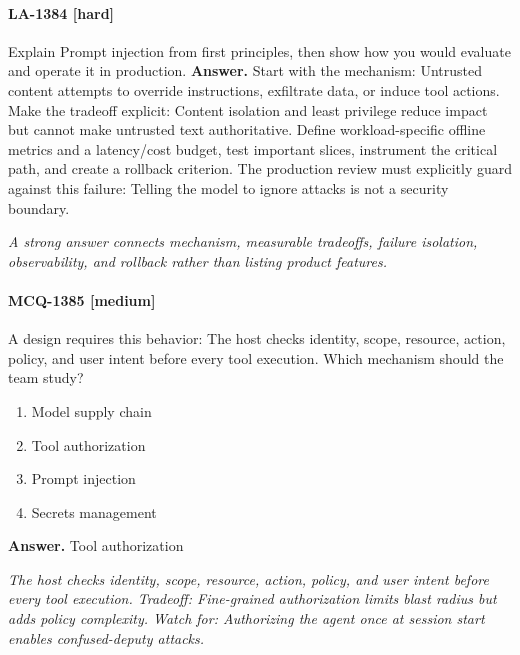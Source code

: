 \paragraph{LA-1384 [hard]} Explain Prompt injection from first principles, then show how you would evaluate and operate it in production.
\noindent\textbf{Answer.} Start with the mechanism: Untrusted content attempts to override instructions, exfiltrate data, or induce tool actions. Make the tradeoff explicit: Content isolation and least privilege reduce impact but cannot make untrusted text authoritative. Define workload-specific offline metrics and a latency/cost budget, test important slices, instrument the critical path, and create a rollback criterion. The production review must explicitly guard against this failure: Telling the model to ignore attacks is not a security boundary.
\par\textit{A strong answer connects mechanism, measurable tradeoffs, failure isolation, observability, and rollback rather than listing product features.}
\paragraph{MCQ-1385 [medium]} A design requires this behavior: The host checks identity, scope, resource, action, policy, and user intent before every tool execution. Which mechanism should the team study?
\begin{enumerate}[label=\Alph*.]
\item Model supply chain
\item Tool authorization
\item Prompt injection
\item Secrets management
\end{enumerate}
\noindent\textbf{Answer.} Tool authorization
\par\textit{The host checks identity, scope, resource, action, policy, and user intent before every tool execution. Tradeoff: Fine-grained authorization limits blast radius but adds policy complexity. Watch for: Authorizing the agent once at session start enables confused-deputy attacks.}
